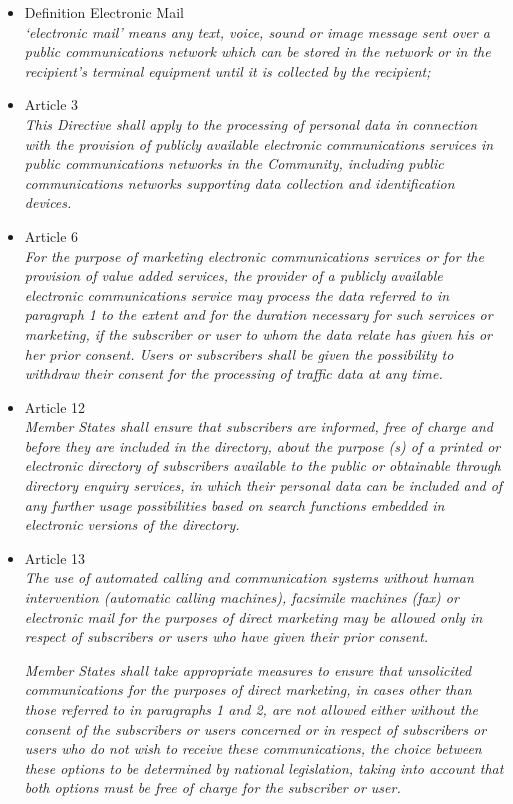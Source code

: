 \documentclass[11pt]{article}
\begin{document}
\begin{itemize}
	\item Definition Electronic Mail\\
		\emph{ ‘electronic mail’ means any text, voice, sound or image message sent over a public communications network which can be stored in the network or in the recipient's terminal equipment until it is collected by the recipient;}

	\item Article 3\\
		\emph{This Directive shall apply to the processing of personal data in connection with the provision of publicly available electronic communications services in public communications networks in the Community, including public communications networks supporting data collection and identification devices.}

	\item Article 6\\
		\emph{For the purpose of marketing electronic communications services or for the provision of value added services, the provider of a publicly available electronic communications service may process the data referred to in paragraph 1 to the extent and for the duration necessary for such services or marketing, if the subscriber or user to whom the data relate has given his or her prior consent. Users or subscribers shall be given the possibility to withdraw their consent for the processing of traffic data at any time.}

	\item Article 12\\
		\emph{Member States shall ensure that subscribers are informed, free of charge and before they are included in the directory, about the purpose (s) of a printed or electronic directory of subscribers available to the public or obtainable through directory enquiry services, in which their personal data can be included and of any further usage possibilities based on search functions embedded in electronic versions of the directory.}

	\item Article 13\\
		\emph{The use of automated calling and communication systems without human intervention (automatic calling machines), facsimile machines (fax) or electronic mail for the purposes of direct marketing may be allowed only in respect of subscribers or users who have given their prior consent.}

		\emph{Member States shall take appropriate measures to ensure that unsolicited communications for the purposes of direct marketing, in cases other than those referred to in paragraphs 1 and 2, are not allowed either without the consent of the subscribers or users concerned or in respect of subscribers or users who do not wish to receive these communications, the choice between these options to be determined by national legislation, taking into account that both options must be free of charge for the subscriber or user.}

\end{itemize}
\end{document}
